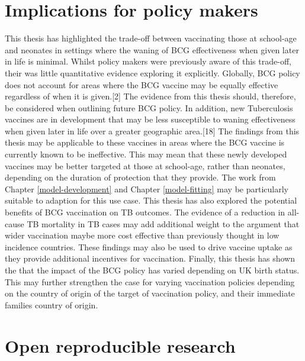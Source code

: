 \documentclass[11pt,twoside]{bristolthesis}
\begin{document}
  \hypertarget{implications-for-policy-makers}{%
  \section{Implications for policy makers}\label{implications-for-policy-makers}}
  
  This thesis has highlighted the trade-off between vaccinating those at school-age and neonates in settings where the waning of BCG effectiveness when given later in life is minimal. Whilst policy makers were previously aware of this trade-off, their was little quantitative evidence exploring it explicitly. Globally, BCG policy does not account for areas where the BCG vaccine may be equally effective regardless of when it is given.{[}2{]} The evidence from this thesis should, therefore, be considered when outlining future BCG policy. In addition, new Tuberculosis vaccines are in development that may be less susceptible to waning effectiveness when given later in life over a greater geographic area.{[}18{]} The findings from this thesis may be applicable to these vaccines in areas where the BCG vaccine is currently known to be ineffective. This may mean that these newly developed vaccines may be better targeted at those at school-age, rather than neonates, depending on the duration of protection that they provide. The work from Chapter \ref{model-development} and Chapter \ref{model-fitting} may be particularly suitable to adaption for this use case. This thesis has also explored the potential benefits of BCG vaccination on TB outcomes. The evidence of a reduction in all-cause TB mortality in TB cases may add additional weight to the argument that wider vaccination maybe more cost effective than previously thought in low incidence countries. These findings may also be used to drive vaccine uptake as they provide additional incentives for vaccination. Finally, this thesis has shown the that the impact of the BCG policy has varied depending on UK birth status. This may further strengthen the case for varying vaccination policies depending on the country of origin of the target of vaccination policy, and their immediate families country of origin.
  
  \hypertarget{open-reproducible-research}{%
  \section{Open reproducible research}\label{open-reproducible-research}}
  
\end{document}
